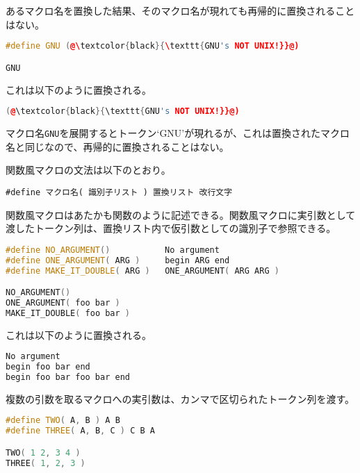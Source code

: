 あるマクロ名を置換した結果、そのマクロ名が現れても再帰的に置換されることはない。

\begin{lstlisting}[language={C++}]
#define GNU (@\textcolor{black}{\texttt{GNU's NOT UNIX!}}@)

GNU
\end{lstlisting}

これは以下のように置換される。

\begin{lstlisting}[language={C++}]
(@\textcolor{black}{\texttt{GNU's NOT UNIX!}}@)
\end{lstlisting}

マクロ名\texttt{GNU}を展開するとトークン`GNU'が現れるが、これは置換されたマクロ名と同じなので、再帰的に置換されることはない。


関数風マクロの文法は以下のとおり。

\begin{lstlisting}[style=grammar]
#define マクロ名( 識別子リスト ) 置換リスト 改行文字
\end{lstlisting}

関数風マクロはあたかも関数のように記述できる。関数風マクロに実引数として渡したトークン列は、置換リスト内で仮引数としての識別子で参照できる。

\begin{lstlisting}[language={C++}]
#define NO_ARGUMENT()           No argument
#define ONE_ARGUMENT( ARG )     begin ARG end
#define MAKE_IT_DOUBLE( ARG )   ONE_ARGUMENT( ARG ARG )

NO_ARGUMENT()
ONE_ARGUMENT( foo bar )
MAKE_IT_DOUBLE( foo bar )
\end{lstlisting}

これは以下のように置換される。

\begin{lstlisting}[language={C++}]
No argument
begin foo bar end
begin foo bar foo bar end
\end{lstlisting}

複数の引数を取るマクロへの実引数は、カンマで区切られたトークン列を渡す。

\begin{lstlisting}[language={C++}]
#define TWO( A, B ) A B
#define THREE( A, B, C ) C B A

TWO( 1 2, 3 4 )
THREE( 1, 2, 3 )
\end{lstlisting}

